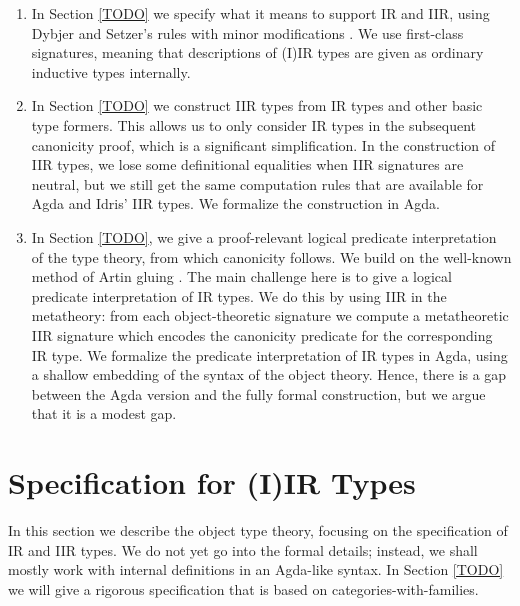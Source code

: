 \documentclass[acmsmall,screen,review,anonymous]{acmart}
\begin{document}
\begin{enumerate}
\item In Section \ref{TODO} we specify what it means to support IR and IIR, using Dybjer and
  Setzer's rules with minor modifications \cite{TODO}. We use first-class signatures,
  meaning that descriptions of (I)IR types are given as ordinary inductive types internally.
\item In Section \ref{TODO} we construct IIR types from IR types and other basic type formers. This
  allows us to only consider IR types in the subsequent canonicity proof, which is a significant
  simplification. In the construction of IIR types, we lose some definitional equalities when IIR
  signatures are neutral, but we still get the same computation rules that are available for Agda and
  Idris' IIR types. We formalize the construction in Agda.
\item In Section \ref{TODO}, we give a proof-relevant logical predicate interpretation of the type
  theory, from which canonicity follows. We build on the well-known method of Artin gluing
  \cite{TODO}. The main challenge here is to give a logical predicate interpretation of IR types. We
  do this by using IIR in the metatheory: from each object-theoretic signature we compute a
  metatheoretic IIR signature which encodes the canonicity predicate for the corresponding IR type.
  We formalize the predicate interpretation of IR types in Agda, using a shallow embedding of the
  syntax of the object theory. Hence, there is a gap between the Agda version and the fully formal
  construction, but we argue that it is a modest gap.
\end{enumerate}

\section{Specification for (I)IR Types}\label{sec:specification}

In this section we describe the object type theory, focusing on the specification of IR and IIR
types. We do not yet go into the formal details; instead, we shall mostly work with internal
definitions in an Agda-like syntax. In Section \ref{TODO} we will give a rigorous specification that
is based on categories-with-families.
\end{document}
